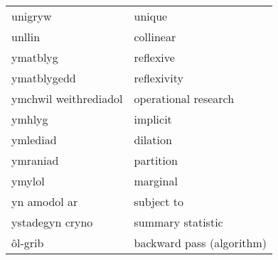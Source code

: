 \begin{supertabular}{p{0.22\textwidth}p{0.22\textwidth}}
unigryw & unique \\
unllin & collinear \\
ymatblyg & reflexive \\
ymatblygedd & reflexivity \\
ymchwil weithrediadol & operational research \\
ymhlyg & implicit \\
ymlediad & dilation \\
ymraniad & partition \\
ymylol & marginal \\
yn amodol ar & subject to \\
ystadegyn cryno & summary statistic \\
ôl-grib & backward pass (algorithm) \\
\end{supertabular}
